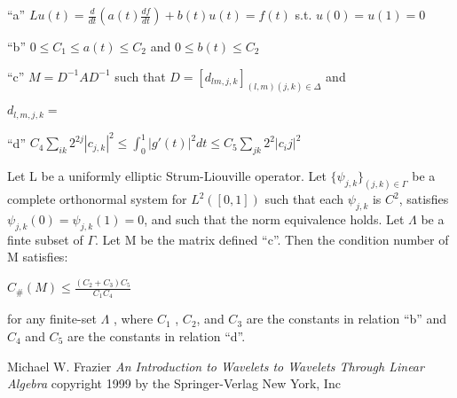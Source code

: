 \documentclass[11pt]{article}
\newtheorem{theorem}{Theorem}
\begin{document}
``a'' $Lu(t) = \frac{d}{dt} (a(t) \frac{df}{dt} ) + b(t)u(t) = f(t) $ s.t. $u(0)=u(1) =0$

``b'' $0 \le C_1 \le a(t) \le C_2 $ and $0 \le b(t) \le C_2 $

``c''  $M=D^{-1} A D^{-1}$  such that $D=[d_{lm,j,k} ] _{(l,m)(j,k)\in \Delta} $ and 

$d_{l,m,j,k} = $

``d'' $C_4 \sum _{ik} 2^{2j} |c_{j,k} | ^2 \le \int ^1 _ 0 |g'(t)| ^2 dt \le C_5 \sum _{jk} 2^2 |c_ij |^2 $

Let L be a uniformly elliptic Strum-Liouville operator.  Let $\{\psi _{j,k} \} _{(j,k)\in \Gamma}$ be a complete orthonormal system for $L^2([0,1])$ such that each $\psi_{j,k}$ is $C^2$, satisfies $\psi _{j,k} (0) = \psi _{j,k} (1) = 0$, and such that the norm equivalence holds.  Let $\Lambda$ be a finte subset of $\Gamma$.  Let M be the matrix defined ``c''.  Then the condition number of M satisfies:

$C_{\#} (M) \le \frac{(C_2 + C_3 )C_5} {C_1 C_4} $

for any finite-set $\Lambda$ , where $C_1$ , $C_2$, and $C_3$ are the constants in relation ``b'' and $C_4$ and $C_5$ are the constants in relation ``d''.   

\begin{thebibliography}{99}

 Michael W. Frazier \textsl {An Introduction to Wavelets to Wavelets Through Linear Algebra} copyright 1999 by the Springer-Verlag  New York, Inc


\end {thebibliography}

 
\end{document}
